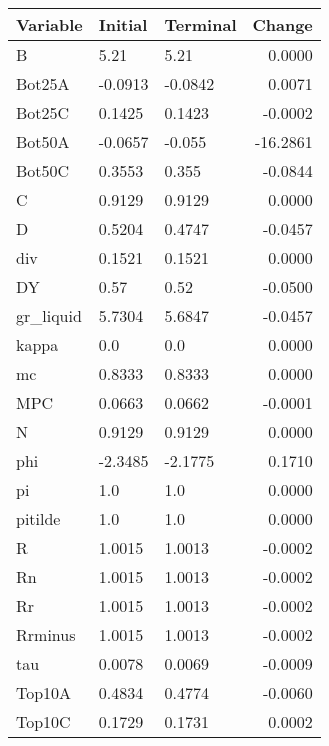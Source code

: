 \begin{table}
\centering
\label{tab:stst_comparison_baseline_limit_permanent}
\begin{tabular}{lllr}
\toprule
                Variable & Initial & Terminal &   Change \\
\midrule
                       B &    5.21 &     5.21 &   0.0000 \\
                  Bot25A & -0.0913 &  -0.0842 &   0.0071 \\
                  Bot25C &  0.1425 &   0.1423 &  -0.0002 \\
                  Bot50A & -0.0657 &   -0.055 & -16.2861 \\
                  Bot50C &  0.3553 &    0.355 &  -0.0844 \\
                       C &  0.9129 &   0.9129 &   0.0000 \\
                       D &  0.5204 &   0.4747 &  -0.0457 \\
                     div &  0.1521 &   0.1521 &   0.0000 \\
                      DY &    0.57 &     0.52 &  -0.0500 \\
               gr\_liquid &  5.7304 &   5.6847 &  -0.0457 \\
                   kappa &     0.0 &      0.0 &   0.0000 \\
                      mc &  0.8333 &   0.8333 &   0.0000 \\
                     MPC &  0.0663 &   0.0662 &  -0.0001 \\
                       N &  0.9129 &   0.9129 &   0.0000 \\
                     phi & -2.3485 &  -2.1775 &   0.1710 \\
                      pi &     1.0 &      1.0 &   0.0000 \\
                 pitilde &     1.0 &      1.0 &   0.0000 \\
                       R &  1.0015 &   1.0013 &  -0.0002 \\
                      Rn &  1.0015 &   1.0013 &  -0.0002 \\
                      Rr &  1.0015 &   1.0013 &  -0.0002 \\
                 Rrminus &  1.0015 &   1.0013 &  -0.0002 \\
                     tau &  0.0078 &   0.0069 &  -0.0009 \\
                  Top10A &  0.4834 &   0.4774 &  -0.0060 \\
                  Top10C &  0.1729 &   0.1731 &   0.0002 \\

\end{tabular}
\end{table}
